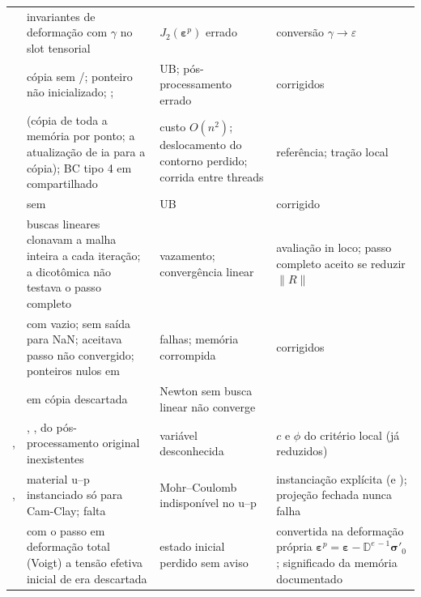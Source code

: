 \documentclass[11pt,a4paper]{article}
\newcommand{\sig}{\bm{\sigma}}
\newcommand{\eps}{\bm{\varepsilon}}
\newcommand{\D}{\mathbb{D}}
\begin{document}
{\begin{longtable}{@{}L{3.0cm}L{4.5cm}L{3.3cm}L{4.4cm}@{}}
 & invariantes de deformação com $\gamma$ no slot tensorial & $J_2(\eps^p)$ errado & conversão $\gamma\to\varepsilon$\\
 & cópia sem /; ponteiro não inicializado; ;  & UB; pós-processamento errado & corrigidos\\
 &  (cópia de toda a memória por ponto; a atualização de  ia para a cópia); BC tipo 4 em  compartilhado & custo $O(n^2)$; deslocamento do contorno perdido; corrida entre threads & referência; tração local\\
 &  sem  & UB & corrigido\\
 & buscas lineares clonavam a malha inteira a cada iteração; a dicotômica não testava o passo completo & vazamento; convergência linear & avaliação in loco; passo completo aceito se reduzir $\|R\|$\\
 &  com  vazio; sem saída para NaN; aceitava passo não convergido; ponteiros nulos em  & falhas; memória corrompida & corrigidos\\
 &  em cópia descartada & Newton sem busca linear não converge & \\
,  & , ,  do pós-processamento original inexistentes & variável desconhecida & $c$ e $\phi$ do critério local (já reduzidos)\\
,  & material u--p instanciado só para Cam-Clay; falta  & Mohr--Coulomb indisponível no u--p & instanciação explícita (e ); projeção fechada nunca falha\\
 & com o passo em deformação total (Voigt) a tensão efetiva inicial de  era descartada & estado inicial perdido sem aviso & convertida na deformação própria $\eps^p=\eps-\D^{e\,-1}\sig'_0$; significado da memória documentado\\
\bottomrule
\end{longtable}}
\end{document}
